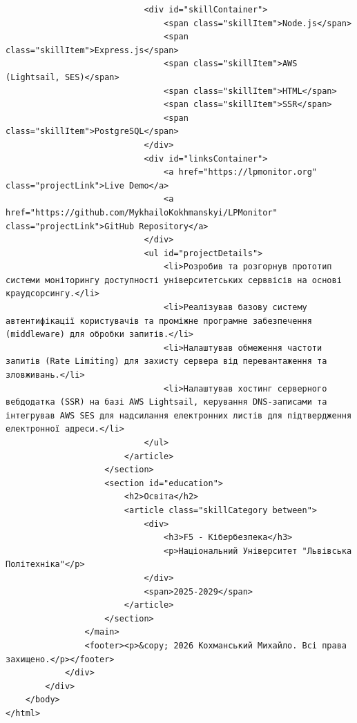 \documentclass[12pt, a4paper]{article}
\begin{document}
\begin{lstlisting}
							<div id="skillContainer">
								<span class="skillItem">Node.js</span>
								<span class="skillItem">Express.js</span>
								<span class="skillItem">AWS (Lightsail, SES)</span>
								<span class="skillItem">HTML</span>
								<span class="skillItem">SSR</span>
								<span class="skillItem">PostgreSQL</span>
							</div>
							<div id="linksContainer">					
								<a href="https://lpmonitor.org" class="projectLink">Live Demo</a>
								<a href="https://github.com/MykhailoKokhmanskyi/LPMonitor" class="projectLink">GitHub Repository</a>
							</div>
							<ul id="projectDetails">
								<li>Розробив та розгорнув прототип системи моніторингу доступності університетських серввісів на основі краудсорсингу.</li>
								<li>Реалізував базову систему автентифікації користувачів та проміжне програмне забезпечення (middleware) для обробки запитів.</li>
								<li>Налаштував обмеження частоти запитів (Rate Limiting) для захисту сервера від перевантаження та зловживань.</li>
								<li>Налаштував хостинг серверного вебдодатка (SSR) на базі AWS Lightsail, керування DNS-записами та інтегрував AWS SES для надсилання електронних листів для підтвердження електронної адреси.</li>
							</ul>
						</article>
					</section>
					<section id="education">
						<h2>Освіта</h2>
						<article class="skillCategory between">
							<div>
								<h3>F5 - Кібербезпека</h3>
								<p>Національний Університет "Львівська Політехніка"</p>
							</div>
							<span>2025-2029</span>
						</article>
					</section>
				</main>
				<footer><p>&copy; 2026 Кохманський Михайло. Всі права захищено.</p></footer>
			</div>
		</div>
	</body>
</html>
\end{lstlisting}
\end{document}
